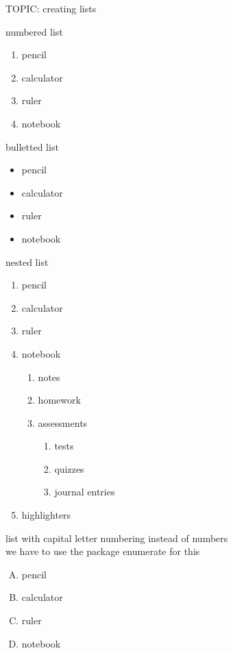 \documentclass[11pt]{article}
\begin{document}
TOPIC: creating lists

numbered list\\

\begin{enumerate}
\item pencil
\item calculator
\item ruler
\item notebook
\end{enumerate}

\vspace{1cm}

bulletted list\\

\begin{itemize}
\item pencil
\item calculator
\item ruler
\item notebook
\end{itemize}

\vspace{1cm}

nested list\\

\begin{enumerate}

\item pencil
\item calculator
\item ruler
\item notebook
    \begin{enumerate}
    \item notes
    \item homework
    \item assessments
        \begin{enumerate}
        \item tests
        \item quizzes
        \item journal entries
        \end{enumerate}
    \end{enumerate}
\item highlighters
\end{enumerate}

\vspace{1cm}

list with capital letter numbering instead of numbers\\
we have to use the package enumerate for this\\
\begin{enumerate}[A.]
\item pencil
\item calculator
\item ruler
\item notebook
\end{enumerate}
\end{document}
